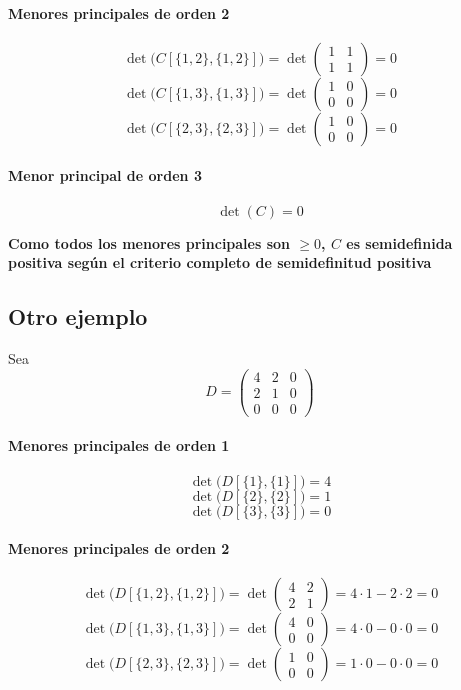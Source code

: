 \documentclass{article}
\begin{document}
\paragraph*{Menores principales de orden 2}  
\[
\det\bigl(C[\{1,2\},\{1,2\}]\bigr)
=\det\begin{pmatrix}1 & 1\\1 & 1\end{pmatrix}
=0
\]
\[
\det\bigl(C[\{1,3\},\{1,3\}]\bigr)
=\det\begin{pmatrix}1 & 0\\0 & 0\end{pmatrix}
=0
\]
\[
\det\bigl(C[\{2,3\},\{2,3\}]\bigr)
=\det\begin{pmatrix}1 & 0\\0 & 0\end{pmatrix}
=0
\]

\paragraph*{Menor principal de orden 3}  
\[
\det(C)
=0
\]

\textbf{\color{teal}Como todos los menores principales son \(\ge 0\), \(C\) es semidefinida positiva según el criterio completo de semidefinitud positiva  }


\subsection*{Otro ejemplo}

Sea  
\[
D = \begin{pmatrix}
4 & 2 & 0\\
2 & 1 & 0\\
0 & 0 & 0
\end{pmatrix}
\]

\paragraph*{Menores principales de orden 1}  
\[
\det\bigl(D[\{1\},\{1\}]\bigr) = 4
\]
\[
\det\bigl(D[\{2\},\{2\}]\bigr) = 1
\]
\[
\det\bigl(D[\{3\},\{3\}]\bigr) = 0
\]

\paragraph*{Menores principales de orden 2}  
\[
\det\bigl(D[\{1,2\},\{1,2\}]\bigr)
= \det\begin{pmatrix}4 & 2\\2 & 1\end{pmatrix}
= 4\cdot1 - 2\cdot2
= 0
\]
\[
\det\bigl(D[\{1,3\},\{1,3\}]\bigr)
= \det\begin{pmatrix}4 & 0\\0 & 0\end{pmatrix}
= 4\cdot0 - 0\cdot0
= 0
\]
\[
\det\bigl(D[\{2,3\},\{2,3\}]\bigr)
= \det\begin{pmatrix}1 & 0\\0 & 0\end{pmatrix}
= 1\cdot0 - 0\cdot0
= 0
\]
\end{document}
